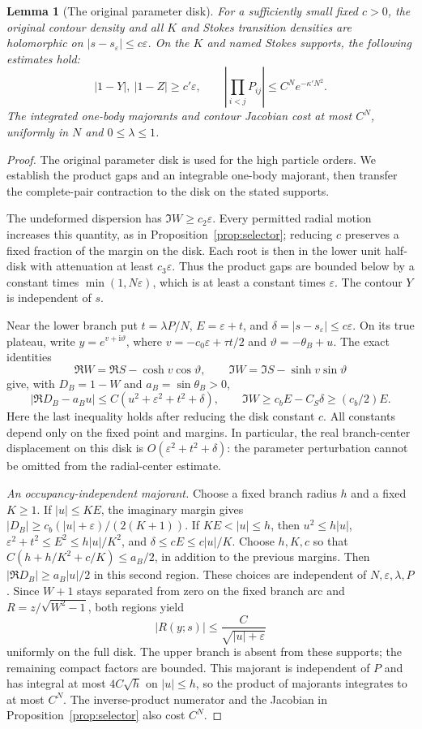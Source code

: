 \documentclass[11pt]{article}
\numberwithin{equation}{section}
\newtheorem{lemma}[theorem]{Lemma}
\theoremstyle{definition}
\newcommand{\ii}{\mathrm i}
\newcommand{\eps}{\varepsilon}
\newcommand{\se}{s_\varepsilon}
\begin{document}
\clearpage
\begin{lemma}[The original parameter disk]\label{lem:originaldisk}
For a sufficiently small fixed \(c>0\), the original contour
density and all \(K\) and Stokes transition densities are holomorphic
on \(|s-s_\eps|\le c\eps\). On the \(K\) and named Stokes
supports, the following estimates hold:
\[
 |1-Y|,\ |1-Z|\ge c'\eps,\qquad
 \left|\prod_{i<j}P_{ij}\right|\le C^Ne^{-\kappa' N^2}.
\]
The integrated one-body majorants and contour Jacobian cost
at most \(C^N\), uniformly in \(N\) and \(0\le\lambda\le1\).
\end{lemma}
\begin{proof}
The original parameter disk is used for the high particle orders. We establish the product gaps and an integrable one-body majorant, then transfer the complete-pair contraction to the disk on the stated supports.

The undeformed dispersion has \(\Im W\ge c_2\eps\).
Every permitted radial motion increases this quantity, as in
Proposition~\ref{prop:selector}; reducing \(c\) preserves a
fixed fraction of the margin on the disk. Each root is then
in the lower unit half-disk with attenuation at least \(c_3\eps\).
Thus the product gaps are bounded below by a constant times
\(\min(1,N\eps)\), which is at least a constant times \(\eps\).
The contour \(Y\) is independent of \(s\).

Near the lower branch put \(t=\lambda P/N\),
\(E=\eps+t\), and \(\delta=|s-\se|\le c\eps\).
On its true plateau, write
\(y=e^{v+\ii\vartheta}\), where
\(v=-c_0\eps+\tau t/2\) and \(\vartheta=-\theta_B+u\).
The exact identities
\[
 \Re W=\Re S-\cosh v\cos\vartheta,\qquad
 \Im W=\Im S-\sinh v\sin\vartheta
\]
give, with \(D_B=1-W\) and \(a_B=\sin\theta_B>0\),
\[
 |\Re D_B-a_Bu|
 \le C(u^2+\eps^2+t^2+\delta),\qquad
 \Im W\ge c_bE-C_S\delta\ge(c_b/2)E.
\]
Here the last inequality holds after reducing the disk constant
\(c\). All constants depend only on the fixed point and margins.
In particular, the real branch-center displacement on this disk is
\(O(\eps^2+t^2+\delta)\): the parameter perturbation cannot be
omitted from the radial-center estimate.

\smallskip\noindent\textit{An occupancy-independent majorant.}
Choose a fixed branch radius \(h\) and a fixed \(K\ge1\).
If \(|u|\le KE\), the imaginary margin gives
\(|D_B|\ge c_b(|u|+\eps)/(2(K+1))\).
If \(KE<|u|\le h\), then
\(u^2\le h|u|\), \(\eps^2+t^2\le E^2\le h|u|/K^2\),
and \(\delta\le cE\le c|u|/K\).
Choose \(h,K,c\) so that
\(C(h+h/K^2+c/K)\le a_B/2\), in addition to the previous margins.
Then \(|\Re D_B|\ge a_B|u|/2\) in this second region.
These choices are independent of \(N,\eps,\lambda,P\).
Since \(W+1\) stays separated from zero on the fixed branch arc
and \(R=z/\sqrt{W^2-1}\), both regions yield
\[
 |R(y;s)|\le \frac{C}{\sqrt{|u|+\eps}}
\]
uniformly on the full disk. The upper branch is absent from
these supports; the remaining compact factors are bounded.
This majorant is independent of \(P\) and has integral at most
\(4C\sqrt h\) on \(|u|\le h\), so the product of majorants
integrates to at most \(C^N\). The inverse-product numerator
and the Jacobian in Proposition~\ref{prop:selector} also cost \(C^N\).


\end{proof}
\end{document}
